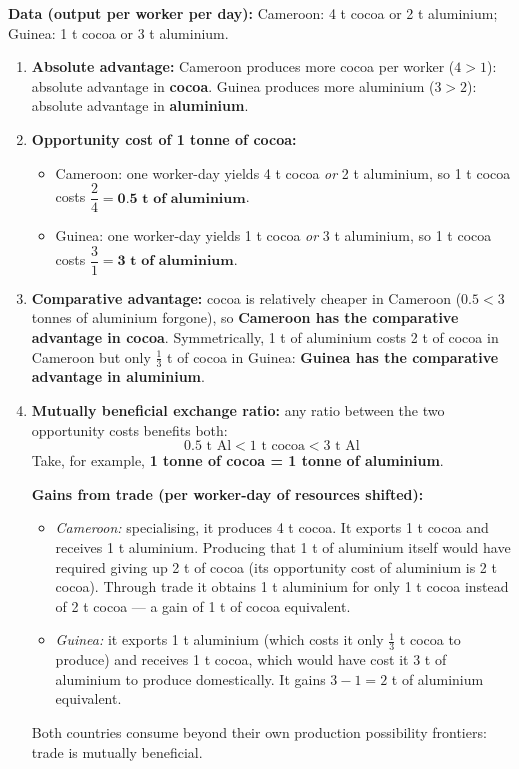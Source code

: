 \documentclass[11pt]{article}
\begin{document}
\begin{corrige}
\textbf{Data (output per worker per day):} Cameroon: 4 t cocoa or 2 t aluminium; Guinea: 1 t cocoa or 3 t aluminium.

\begin{enumerate}
\item \textbf{Absolute advantage:} Cameroon produces more cocoa per worker ($4>1$): absolute advantage in \textbf{cocoa}. Guinea produces more aluminium ($3>2$): absolute advantage in \textbf{aluminium}.

\item \textbf{Opportunity cost of 1 tonne of cocoa:}
\begin{itemize}
\item Cameroon: one worker-day yields 4 t cocoa \emph{or} 2 t aluminium, so 1 t cocoa costs $\dfrac{2}{4} = \textbf{0.5 t of aluminium}$.
\item Guinea: one worker-day yields 1 t cocoa \emph{or} 3 t aluminium, so 1 t cocoa costs $\dfrac{3}{1} = \textbf{3 t of aluminium}$.
\end{itemize}

\item \textbf{Comparative advantage:} cocoa is relatively cheaper in Cameroon ($0.5 < 3$ tonnes of aluminium forgone), so \textbf{Cameroon has the comparative advantage in cocoa}. Symmetrically, 1 t of aluminium costs 2 t of cocoa in Cameroon but only $\tfrac{1}{3}$ t of cocoa in Guinea: \textbf{Guinea has the comparative advantage in aluminium}.

\item \textbf{Mutually beneficial exchange ratio:} any ratio between the two opportunity costs benefits both:
\[ 0.5 \text{ t Al} < 1 \text{ t cocoa} < 3 \text{ t Al} \]
Take, for example, \textbf{1 tonne of cocoa = 1 tonne of aluminium}.

\textbf{Gains from trade (per worker-day of resources shifted):}
\begin{itemize}
\item \emph{Cameroon:} specialising, it produces 4 t cocoa. It exports 1 t cocoa and receives 1 t aluminium. Producing that 1 t of aluminium itself would have required giving up 2 t of cocoa (its opportunity cost of aluminium is 2 t cocoa). Through trade it obtains 1 t aluminium for only 1 t cocoa instead of 2 t cocoa — a gain of 1 t of cocoa equivalent.
\item \emph{Guinea:} it exports 1 t aluminium (which costs it only $\tfrac{1}{3}$ t cocoa to produce) and receives 1 t cocoa, which would have cost it 3 t of aluminium to produce domestically. It gains $3 - 1 = 2$ t of aluminium equivalent.
\end{itemize}
Both countries consume beyond their own production possibility frontiers: trade is mutually beneficial.
\end{enumerate}
\end{corrige}
\end{document}
